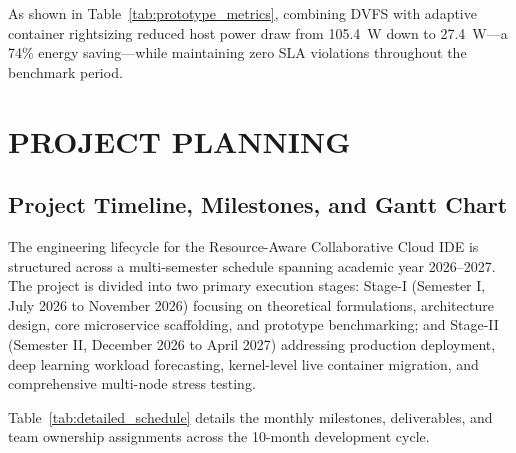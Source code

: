 \documentclass[12pt,a4paper]{report}
\begin{document}
	As shown in Table~\ref{tab:prototype_metrics}, combining DVFS with adaptive container rightsizing reduced host power draw from 105.4~W down to 27.4~W---a 74\% energy saving---while maintaining zero SLA violations throughout the benchmark period.
	
	\chapter{PROJECT PLANNING}
	
	\section{Project Timeline, Milestones, and Gantt Chart}
	The engineering lifecycle for the Resource-Aware Collaborative Cloud IDE is structured across a multi-semester schedule spanning academic year 2026--2027. The project is divided into two primary execution stages: Stage-I (Semester I, July 2026 to November 2026) focusing on theoretical formulations, architecture design, core microservice scaffolding, and prototype benchmarking; and Stage-II (Semester II, December 2026 to April 2027) addressing production deployment, deep learning workload forecasting, kernel-level live container migration, and comprehensive multi-node stress testing.
	
	Table~\ref{tab:detailed_schedule} details the monthly milestones, deliverables, and team ownership assignments across the 10-month development cycle.
	
\end{document}
